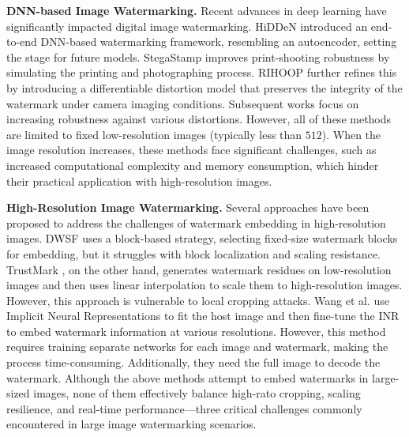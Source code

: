 \documentclass{article}
\begin{document}
\textbf{DNN-based Image Watermarking.} Recent advances in deep learning have significantly impacted digital image watermarking. HiDDeN \cite{zhu2018hidden} introduced an end-to-end DNN-based watermarking framework, resembling an autoencoder, setting the stage for future models. StegaStamp \cite{tancik2020stegastamp} improves print-shooting robustness by simulating the printing and photographing process. RIHOOP \cite{jia2020rihoop} further refines this by introducing a differentiable distortion model that preserves the integrity of the watermark under camera imaging conditions. Subsequent works \cite{jia2021mbrs, fang2023flow, li2024screen, sun2024end} focus on increasing robustness against various distortions. However, all of these methods are limited to fixed low-resolution images (typically less than $512$). When the image resolution increases, these methods face significant challenges, such as increased computational complexity and memory consumption, which hinder their practical application with high-resolution images.

\textbf{High-Resolution Image Watermarking.} Several approaches have been proposed to address the challenges of watermark embedding in high-resolution images. DWSF \cite{guo2023practical} uses a block-based strategy, selecting fixed-size watermark blocks for embedding, but it struggles with block localization and scaling resistance. TrustMark \cite{bui2023trustmark}, on the other hand, generates watermark residues on low-resolution images and then uses linear interpolation to scale them to high-resolution images. However, this approach is vulnerable to local cropping attacks. Wang et al. \cite{wang2024achieving} use Implicit Neural Representations to fit the host image and then fine-tune the INR to embed watermark information at various resolutions. However, this method requires training separate networks for each image and watermark, making the process time-consuming. Additionally, they need the full image to decode the watermark. Although the above methods attempt to embed watermarks in large-sized images, none of them effectively balance high-rato cropping, scaling resilience, and real-time performance—three critical challenges commonly encountered in large image watermarking scenarios.
\end{document}
